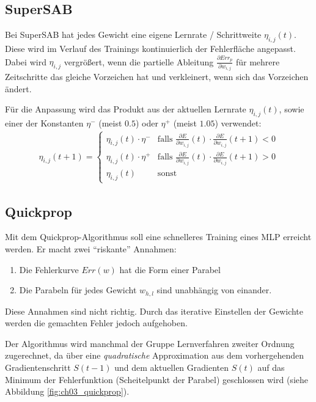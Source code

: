 \subsection*{SuperSAB}
Bei SuperSAB hat jedes Gewicht eine eigene Lernrate / Schrittweite $\eta_{i,j}(t)$. Diese wird im Verlauf des Trainings kontinuierlich der Fehlerfläche angepasst. Dabei wird $\eta_{i,j}$ vergrößert, wenn die partielle Ableitung $\frac{\partial Err_p}{\partial w_{i,j}}$ für mehrere Zeitschritte das gleiche Vorzeichen hat und verkleinert, wenn sich das Vorzeichen ändert.

Für die Anpassung wird das Produkt aus der aktuellen Lernrate $\eta_{i,j}(t)$, sowie einer der Konstanten $\eta^-$ (meist $0.5$) oder $\eta^+$ (meist $1.05$) verwendet:
\begin{align*}
	\eta_{i,j}(t+1) = 
	\begin{cases}
		\eta_{i,j}(t) \cdot \eta^- &\text{falls }
			\frac{\partial E}{\partial w_{i,j}}(t) \cdot
			\frac{\partial E}{\partial w_{i,j}}(t+1) < 0 \\
		\eta_{i,j}(t) \cdot \eta^+ &\text{falls }
			\frac{\partial E}{\partial w_{i,j}}(t) \cdot
			\frac{\partial E}{\partial w_{i,j}}(t+1) > 0 \\
		\eta_{i,j}(t) &\text{sonst}
	\end{cases}
\end{align*}


\subsection*{Quickprop}
Mit dem Quickprop-Algorithmus soll eine schnelleres Training eines MLP erreicht werden. Er macht zwei "`riskante"' Annahmen:
\begin{enumerate}
	\item Die Fehlerkurve $Err(w)$ hat die Form einer Parabel
	\item Die Parabeln für jedes Gewicht $w_{h,l}$ sind unabhängig von einander.
\end{enumerate}
Diese Annahmen sind nicht richtig. Durch das iterative Einstellen der Gewichte werden die gemachten Fehler jedoch aufgehoben.

Der Algorithmus wird manchmal der Gruppe Lernverfahren zweiter Ordnung zugerechnet, da über eine \emph{quadratische} Approximation aus dem vorhergehenden Gradientenschritt $S(t-1)$ und dem aktuellen Gradienten $S(t)$ auf das Minimum der Fehlerfunktion (Scheitelpunkt der Parabel) geschlossen wird (siehe Abbildung \ref{fig:ch03_quickprop}).

